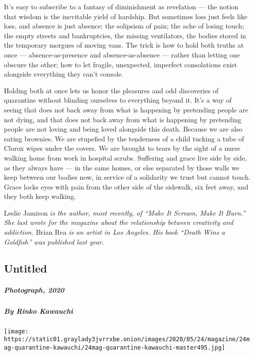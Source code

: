 It's easy to subscribe to a fantasy of diminishment as revelation ---
the notion that wisdom is the inevitable yield of hardship. But
sometimes loss just feels like loss, and absence is just absence: the
solipsism of pain; the ache of losing touch; the empty streets and
bankruptcies, the missing ventilators, the bodies stored in the
temporary morgues of moving vans. The trick is how to hold both truths
at once --- absence-as-presence and absence-as-absence --- rather than
letting one obscure the other; how to let fragile, unexpected, imperfect
consolations exist alongside everything they can't console.

Holding both at once lets us honor the pleasures and odd discoveries of
quarantine without blinding ourselves to everything beyond it. It's a
way of seeing that does not back away from what is happening by
pretending people are not dying, and that does not back away from what
is happening by pretending people are not loving and being loved
alongside this death. Because we are also eating brownies. We are
stupefied by the tenderness of a child tucking a tube of Clorox wipes
under the covers. We are brought to tears by the sight of a nurse
walking home from work in hospital scrubs. Suffering and grace live side
by side, as they always have --- in the same homes, or else separated by
those walls we keep between our bodies now, in service of a solidarity
we trust but cannot touch. Grace locks eyes with pain from the other
side of the sidewalk, six feet away, and they both keep walking.

Leslie Jamison \emph{is the author, most recently, of ``Make It Scream,
Make It Burn.'' She last wrote for the magazine about the relationship
between creativity and addiction.} Brian Rea \emph{is an artist in Los
Angeles. His book ``Death Wins a Goldfish'' was published last year.}

\hypertarget{untitled-2}{%
\subsection{Untitled}\label{untitled-2}}

\hypertarget{photograph-2020-5}{%
\subparagraph{Photograph, 2020}\label{photograph-2020-5}}

\hypertarget{by-rinko-kawauchi-2}{%
\subparagraph{By Rinko Kawauchi}\label{by-rinko-kawauchi-2}}

\texttt{[image: https://static01.graylady3jvrrxbe.onion/images/2020/05/24/magazine/24mag-quarantine-kawauchi/24mag-quarantine-kawauchi-master495.jpg]}

